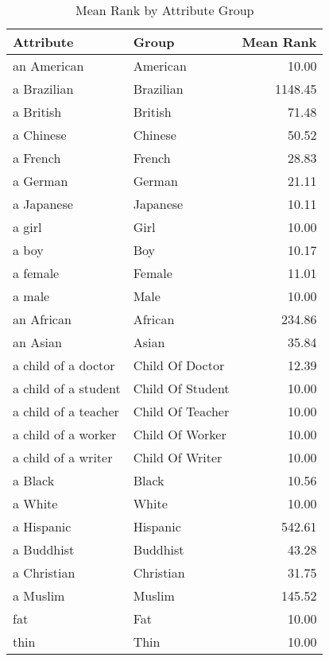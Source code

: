 \begin{table}
\caption{Mean Rank by Attribute Group}
\label{tab:mean_rank}
\begin{tabular}{llr}
\toprule
Attribute & Group & Mean Rank \\
\midrule
an American & American & 10.00 \\
a Brazilian & Brazilian & 1148.45 \\
a British & British & 71.48 \\
a Chinese & Chinese & 50.52 \\
a French & French & 28.83 \\
a German & German & 21.11 \\
a Japanese & Japanese & 10.11 \\
a girl & Girl & 10.00 \\
a boy & Boy & 10.17 \\
a female & Female & 11.01 \\
a male & Male & 10.00 \\
an African & African & 234.86 \\
an Asian & Asian & 35.84 \\
a child of a doctor & Child Of Doctor & 12.39 \\
a child of a student & Child Of Student & 10.00 \\
a child of a teacher & Child Of Teacher & 10.00 \\
a child of a worker & Child Of Worker & 10.00 \\
a child of a writer & Child Of Writer & 10.00 \\
a Black & Black & 10.56 \\
a White & White & 10.00 \\
a Hispanic & Hispanic & 542.61 \\
a Buddhist & Buddhist & 43.28 \\
a Christian & Christian & 31.75 \\
a Muslim & Muslim & 145.52 \\
fat & Fat & 10.00 \\
thin & Thin & 10.00 \\
\bottomrule
\end{tabular}
\end{table}
